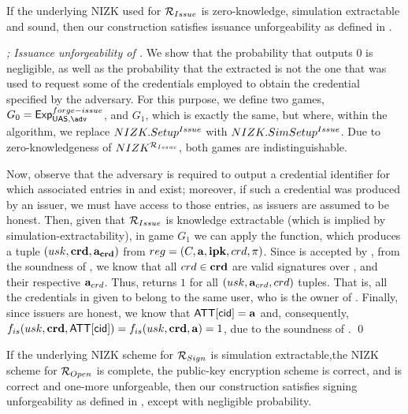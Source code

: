 \begin{theorem}
  \label{thm:issue-forge-uas}
  If the underlying NIZK used for $\mathcal{R}_{Issue}$ is zero-knowledge,
  simulation extractable and sound, then our \CUASGen construction satisfies
  issuance unforgeability as defined in .
\end{theorem}

\begin{proof}[; Issuance unforgeability of \CUASGen]
  We show that the probability that \fissue outputs $0$ is negligible, as well
  as the probability that the extracted \usk is not the one that was used to
  request some of the credentials employed to obtain the credential specified by
  the adversary.
  For this purpose, we define two games, $G_0=\ExpForgeIssue$, and $G_1$, which
  is exactly the same, but where, within the \Setup algorithm, we replace
  $NIZK.Setup^{Issue}$ with $NIZK.SimSetup^{Issue}$. Due to zero-knowledgeness
  of $NIZK^{\mathcal{R}_{Issue}}$, both games are indistinguishable.

  Now, observe that the adversary is required to output a credential
  identifier for which associated entries in \trans and \CRED exist; moreover,
  if such a credential was produced by an issuer, we must have access to those
  entries, as issuers are assumed to be honest.
  Then, given that $\mathcal{R}_{Issue}$ is knowledge extractable (which is implied
  by simulation-extractability), in game $G_1$
  we can apply the \NIZKExtract function, which produces a tuple $(usk,\mathbf{crd},
  \mathbf{a}_{\mathbf{crd}})$ from $reg = (C,\mathbf{a},\mathbf{ipk},crd,\pi)$.
  Since \NIZKproof is accepted by \ExtractIssue, from the soundness of \NIZK, we
  know that all $crd \in \mathbf{crd}$ are valid signatures over \usk, and their
  respective $\mathbf{a}_{crd}$. Thus, \IdentifyCred returns $1$ for all $(usk,
  \mathbf{a}_{crd},crd)$ tuples. That is, all the credentials in \scred given
  to \fissue belong to the same user, who is the owner of \usk.
  Finally, since issuers are honest, we know that $\mathsf{ATT}[\mathsf{cid}] = \mathbf{a}$ and,
  consequently, $f_{is}(usk,\mathbf{crd},\mathsf{ATT}[\mathsf{cid}]) = f_{is}(usk,\mathbf{crd},\mathbf{a})
  = 1$, due to the soundness of \NIZK.
  \qed
\end{proof}

\begin{theorem}
  \label{thm:sign-forge-uas}
  If the underlying NIZK scheme for $\mathcal{R}_{Sign}$ is simulation
  extractable,the NIZK scheme for $\mathcal{R}_{Open}$ is complete, the public-key
  encryption scheme is correct, and \SBCM is correct and one-more unforgeable,
  then our \CUASGen construction satisfies signing unforgeability as defined in
  , except with negligible probability.
\end{theorem}

